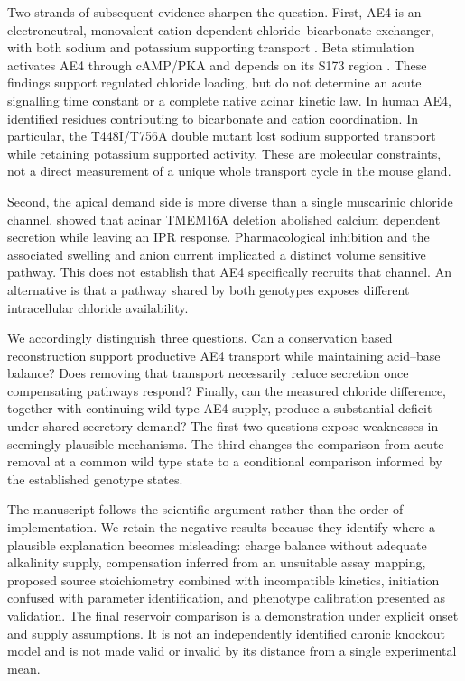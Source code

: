 \documentclass[11pt]{article}
\begin{document}
Two strands of subsequent evidence sharpen the question. First, AE4 is an electroneutral, monovalent cation dependent chloride--bicarbonate exchanger, with both sodium and potassium supporting transport \citep{Pena2016}. Beta stimulation activates AE4 through cAMP/PKA and depends on its S173 region \citep{Pena2021}. These findings support regulated chloride loading, but do not determine an acute signalling time constant or a complete native acinar kinetic law. In human AE4, \citet{Catalan2025} identified residues contributing to bicarbonate and cation coordination. In particular, the T448I/T756A double mutant lost sodium supported transport while retaining potassium supported activity. These are molecular constraints, not a direct measurement of a unique whole transport cycle in the mouse gland.

Second, the apical demand side is more diverse than a single muscarinic chloride channel. \citet{Catalan2015} showed that acinar TMEM16A deletion abolished calcium dependent secretion while leaving an IPR response. Pharmacological inhibition and the associated swelling and anion current implicated a distinct volume sensitive pathway. This does not establish that AE4 specifically recruits that channel. An alternative is that a pathway shared by both genotypes exposes different intracellular chloride availability.

We accordingly distinguish three questions. Can a conservation based reconstruction support productive AE4 transport while maintaining acid--base balance? Does removing that transport necessarily reduce secretion once compensating pathways respond? Finally, can the measured chloride difference, together with continuing wild type AE4 supply, produce a substantial deficit under shared secretory demand? The first two questions expose weaknesses in seemingly plausible mechanisms. The third changes the comparison from acute removal at a common wild type state to a conditional comparison informed by the established genotype states.

The manuscript follows the scientific argument rather than the order of implementation. We retain the negative results because they identify where a plausible explanation becomes misleading: charge balance without adequate alkalinity supply, compensation inferred from an unsuitable assay mapping, proposed source stoichiometry combined with incompatible kinetics, initiation confused with parameter identification, and phenotype calibration presented as validation. The final reservoir comparison is a demonstration under explicit onset and supply assumptions. It is not an independently identified chronic knockout model and is not made valid or invalid by its distance from a single experimental mean.
\end{document}
